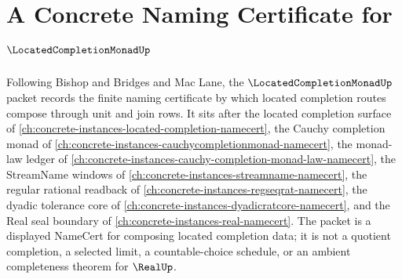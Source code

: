 \chapter{A Concrete Naming Certificate for $\LocatedCompletionMonadUp$}
\label{ch:concrete-instances-located-completion-monad-namecert}

Following Bishop and Bridges and Mac Lane, the $\LocatedCompletionMonadUp$ packet records the finite naming certificate by which located completion routes compose through unit and join rows. It sits after the located completion surface of \autoref{ch:concrete-instances-located-completion-namecert}, the Cauchy completion monad of \autoref{ch:concrete-instances-cauchycompletionmonad-namecert}, the monad-law ledger of \autoref{ch:concrete-instances-cauchy-completion-monad-law-namecert}, the StreamName windows of \autoref{ch:concrete-instances-streamname-namecert}, the regular rational readback of \autoref{ch:concrete-instances-regseqrat-namecert}, the dyadic tolerance core of \autoref{ch:concrete-instances-dyadicratcore-namecert}, and the Real seal boundary of \autoref{ch:concrete-instances-real-namecert}. The packet is a displayed NameCert for composing located completion data; it is not a quotient completion, a selected limit, a countable-choice schedule, or an ambient completeness theorem for $\RealUp$.

